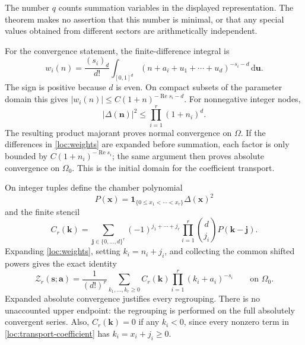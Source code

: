 \documentclass[11pt,a4paper]{article}
\numberwithin{equation}{section}
\theoremstyle{definition}
\theoremstyle{remark}
\newcommand{\dd}{\,\mathrm d}
\newcommand{\Rea}{\operatorname{Re}}
\newcommand{\ind}{\mathbf 1}
\begin{document}
The number $q$ counts summation variables in the displayed representation.
The theorem makes no assertion that this number is minimal, or that any
special values obtained from different sectors are arithmetically
independent.

For the convergence statement, the finite-difference integral is
\begin{equation}
 w_i(n)=\frac{(s_i)_d}{d!}
       \int_{[0,1]^d}
       (n+a_i+u_1+\cdots+u_d)^{-s_i-d}\dd\mathbf u.
 \label{loc:difference-integral}
\end{equation}
The sign is positive because $d$ is even.  On compact subsets of the
parameter domain this gives
$|w_i(n)|\le C(1+n)^{-\Rea s_i-d}$.  For nonnegative integer nodes,
\begin{equation}
 |\Delta(\mathbf n)|^2\le\prod_{i=1}^r(1+n_i)^d.
 \label{loc:vandermonde-bound}
\end{equation}
The resulting product majorant proves normal convergence on $\Omega$.
If the differences in \eqref{loc:weights} are expanded before summation,
each factor is only bounded by $C(1+n_i)^{-\Rea s_i}$; the same argument
then proves absolute convergence on $\Omega_0$.  This is the initial
domain for the coefficient transport.

On integer tuples define the chamber polynomial
\begin{equation}
 P(\mathbf x)=\ind_{\{0\le x_1<\cdots<x_r\}}
                                      \Delta(\mathbf x)^2
 \label{loc:chamber}
\end{equation}
and the finite stencil
\begin{equation}
 C_r(\mathbf k)=
 \sum_{\mathbf j\in\{0,\ldots,d\}^r}
       (-1)^{j_1+\cdots+j_r}\prod_{i=1}^r\binom d{j_i}
       P(\mathbf k-\mathbf j).
 \label{loc:transport-coefficient}
\end{equation}
Expanding \eqref{loc:weights}, setting $k_i=n_i+j_i$, and collecting the
common shifted powers gives the exact identity
\begin{equation}
 \mathcal Z_r(\mathbf s;\mathbf a)
 =\frac1{(d!)^r}\sum_{k_1,\ldots,k_r\ge0}
               C_r(\mathbf k)\prod_{i=1}^r(k_i+a_i)^{-s_i}
 \qquad\text{on }\Omega_0.
 \label{loc:transport}
\end{equation}
Expanded absolute convergence justifies every regrouping.  There is no
unaccounted upper endpoint: the regrouping is performed on the full
absolutely convergent series.  Also, $C_r(\mathbf k)=0$ if any $k_i<0$,
since every nonzero term in \eqref{loc:transport-coefficient} has
$k_i=x_i+j_i\ge0$.
\end{document}

